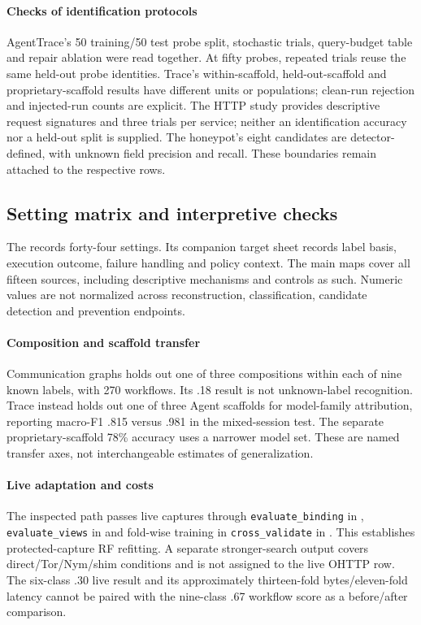 

\paragraph{Checks of identification protocols} AgentTrace's 50 training/50 test probe split, stochastic trials, query-budget table and repair ablation were read together. At fifty probes, repeated trials reuse the same held-out probe identities. Trace's within-scaffold, held-out-scaffold and proprietary-scaffold results have different units or populations; clean-run rejection and injected-run counts are explicit. The HTTP study provides descriptive request signatures and three trials per service; neither an identification accuracy nor a held-out split is supplied. The honeypot's eight candidates are detector-defined, with unknown field precision and recall. These boundaries remain attached to the respective rows.

\subsection{Setting matrix and interpretive checks}
The  records forty-four settings. Its companion target sheet records label basis, execution outcome, failure handling and policy context. The main maps cover all fifteen sources, including descriptive mechanisms and controls as such. Numeric values are not normalized across reconstruction, classification, candidate detection and prevention endpoints.

\paragraph{Composition and scaffold transfer} Communication graphs holds out one of three compositions within each of nine known labels, with 270 workflows. Its .18 result is not unknown-label recognition. Trace instead holds out one of three Agent scaffolds for model-family attribution, reporting macro-F1 .815 versus .981 in the mixed-session test. The separate proprietary-scaffold 78\% accuracy uses a narrower model set. These are named transfer axes, not interchangeable estimates of generalization.

\paragraph{Live adaptation and costs} The inspected  path passes live captures through \texttt{evaluate\_binding} in , \texttt{evaluate\_views} in  and fold-wise training in \texttt{cross\_validate} in . This establishes protected-capture RF refitting. A separate stronger-search output covers direct/Tor/Nym/shim conditions and is not assigned to the live OHTTP row. The six-class .30 live result and its approximately thirteen-fold bytes/eleven-fold latency cannot be paired with the nine-class .67 workflow score as a before/after comparison.

